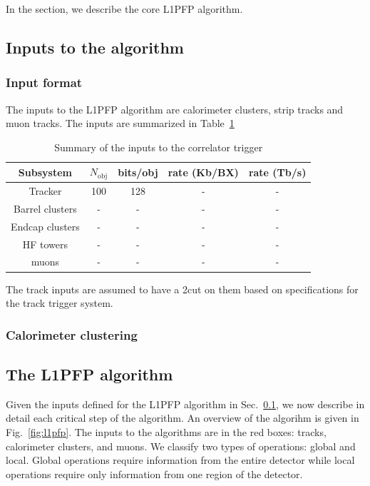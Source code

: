 In the section, we describe the core L1PFP algorithm.

\subsection{Inputs to the algorithm}
\label{sec:algo:input}

\subsubsection{Input format}

The inputs to the L1PFP algorithm are calorimeter clusters, strip tracks and muon tracks. 
The inputs are summarized in Table~\ref{tab:inputs}

\begin{table}[hbtp]
\begin{center}
 \caption{Summary of the inputs to the correlator trigger}
\begin{tabular}{ |c|cc|cc| } 
 \hline
 Subsystem & $N_\text{obj}$ & bits/obj & rate (Kb/BX) & rate (Tb/s)  \\ 
 \hline
 Tracker & 100 & 128 & - & - \\
 Barrel clusters & - & - & - & - \\
 Endcap clusters & - & - & - & - \\
 HF towers & - & - & - & - \\
 muons & - & - & - & - \\
 \hline
\end{tabular}
\label{tab:inputs}
\end{center}
\end{table}

The track inputs are assumed to have a 2\GeV \pt cut on them based on specifications for the track trigger system.

\subsubsection{Calorimeter clustering}

\subsection{The L1PFP algorithm}

Given the inputs defined for the L1PFP algorithm in Sec.~\ref{sec:algo:input}, we now describe
in detail each critical step of the algorithm.
An overview of the algorihm is given in Fig.~\ref{fig:l1pfp}. 
The inputs to the algorithms are in the red boxes: tracks, calorimeter clusters, and muons. 
We classify two types of operations: global and local.  
Global operations require information from the entire detector while local operations require 
only information from one region of the detector. 

